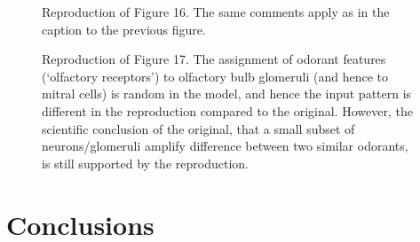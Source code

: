 \begin{figure}
    \begin{minipage}{0.48\textwidth}
        \caption{Reproduction of Figure 16. The same comments apply as in the caption to the previous figure.}
    \end{minipage}\hfill
    \begin{minipage}{0.48\textwidth}
        \caption{Reproduction of Figure 17. The assignment of odorant features (`olfactory receptors') to olfactory bulb glomeruli
        (and hence to mitral cells) is random in the model, and hence the input pattern is different in the reproduction compared to
        the original. However, the scientific conclusion of the original, that a small subset of neurons/glomeruli
        amplify difference between two similar odorants, is still supported by the reproduction.
        }
    \end{minipage}
\end{figure}





\section{Conclusions}



